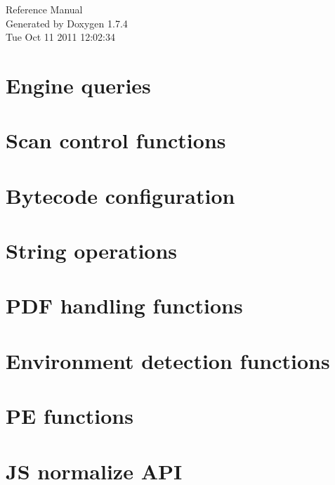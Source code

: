 \documentclass[a4paper]{article}
\begin{document}
\hypersetup{pageanchor=false}
\begin{titlepage}
\vspace*{7cm}
\begin{center}
{\Large Reference Manual}\\
\vspace*{1cm}
{\large Generated by Doxygen 1.7.4}\\
\vspace*{0.5cm}
{\small Tue Oct 11 2011 12:02:34}\\
\end{center}
\end{titlepage}
\tableofcontents
{}
\hypersetup{pageanchor=true}
\section{Engine queries}
\label{engineq}
\hypertarget{engineq}{}

\section{Scan control functions}
\label{scanc}
\hypertarget{scanc}{}

\section{Bytecode configuration}
\label{config}
\hypertarget{config}{}

\section{String operations}
\label{stringops}
\hypertarget{stringops}{}

\section{PDF handling functions}
\label{pdfg}
\hypertarget{pdfg}{}

\section{Environment detection functions}
\label{envdet}
\hypertarget{envdet}{}

\section{PE functions}
\label{pe}
\hypertarget{pe}{}

\section{JS normalize API}
\label{js}
\hypertarget{js}{}

\end{document}
